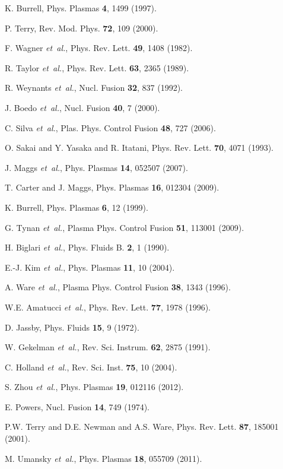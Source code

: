 \documentclass[aip,pop,amsmath,amssymb,reprint,superscriptaddress]{revtex4-1} %
\begin{document}
\providecommand{\noopsort}[1]{}\providecommand{\singleletter}[1]{#1}%
\begin{thebibliography}{10}

K. Burrell, Phys. Plasmas {\bf 4},  1499  (1997).

P. Terry, Rev. Mod. Phys. {\bf 72},  109  (2000).

F. Wagner {\it et~al.}, Phys. Rev. Lett. {\bf 49},  1408  (1982).

R. Taylor {\it et~al.}, Phys. Rev. Lett. {\bf 63},  2365  (1989).

R. Weynants {\it et~al.}, Nucl. Fusion {\bf 32},  837  (1992).

J. Boedo {\it et~al.}, Nucl. Fusion {\bf 40},  7  (2000).

C. Silva {\it et~al.}, Plas. Phys. Control Fusion {\bf 48},  727  (2006).

O. Sakai and Y. Yasaka and R. Itatani, Phys. Rev. Lett. {\bf 70},  4071 (1993).

J. Maggs {\it et~al.}, Phys. Plasmas {\bf 14},  052507  (2007).

T. Carter and J. Maggs, Phys. Plasmas {\bf 16},  012304  (2009).

K. Burrell, Phys. Plasmas {\bf 6},  12  (1999).

G. Tynan {\it et~al.}, Plasma Phys. Control Fusion {\bf 51}, 113001  (2009).

H. Biglari {\it et~al.}, Phys. Fluids B. {\bf 2},  1  (1990).

E.-J. Kim {\it et~al.}, Phys. Plasmas {\bf 11},  10  (2004).

A. Ware {\it et~al.}, Plasma Phys. Control Fusion
  {\bf 38},  1343  (1996).

W.E. Amatucci {\it et~al.}, Phys. Rev. Lett. {\bf 77},  1978  (1996).

D. Jassby, Phys. Fluids {\bf 15},  9  (1972).

W. Gekelman {\it et~al.}, Rev. Sci. Instrum. {\bf 62},  2875  (1991).

C. Holland {\it et~al.}, Rev. Sci. Inst. {\bf 75},  10
  (2004).

S. Zhou {\it et~al.}, Phys. Plasmas {\bf 19},  012116  (2012).

E. Powers, Nucl. Fusion {\bf 14},  749  (1974).

P.W. Terry and D.E. Newman and A.S. Ware, Phys. Rev. Lett. {\bf 87}, 185001  (2001).

M. Umansky {\it et~al.}, Phys. Plasmas {\bf 18},  055709  (2011).

\end{thebibliography}
\end{document}

